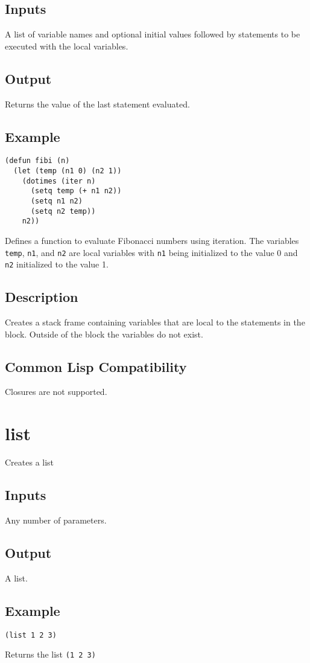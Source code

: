 \documentclass[10pt, openany]{book}
\newcommand{\keyword}[1]{\texttt{#1}}
\begin{document}
\subsection{Inputs}
A list of variable names and optional initial values followed by statements to be executed with the local variables.
\subsection{Output}
Returns the value of the last statement evaluated.
\subsection{Example}
\begin{lstlisting}
(defun fibi (n)
  (let (temp (n1 0) (n2 1))
    (dotimes (iter n)
      (setq temp (+ n1 n2))
      (setq n1 n2)
      (setq n2 temp))
    n2))
\end{lstlisting}
Defines a function to evaluate Fibonacci numbers using iteration.  The variables \keyword{temp}, \keyword{n1}, and \keyword{n2} are local variables with \keyword{n1} being initialized to the value 0 and \keyword{n2} initialized to the value 1.
\subsection{Description}
Creates a stack frame containing variables that are local to the statements in the block.  Outside of the block the variables do not exist.
\subsection{Common Lisp Compatibility}
Closures are not supported.

\section{list}
Creates a list
\subsection{Inputs}
Any number of parameters.
\subsection{Output}
A list.
\subsection{Example}
\begin{lstlisting}
(list 1 2 3)
\end{lstlisting}
Returns the list \keyword{(1 2 3)}
\end{document}
